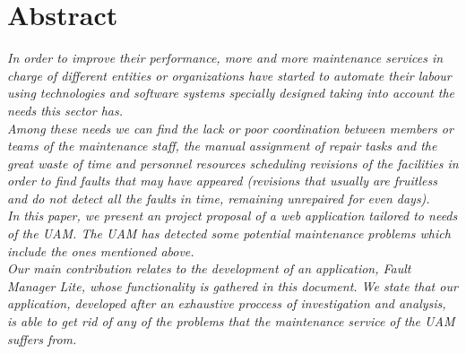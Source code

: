 \section{Abstract}

\textit{
In order to improve their performance, more and more maintenance services in charge of different entities or organizations have started to automate their labour using technologies and software systems specially designed taking into account the needs this sector has.\\
Among these needs we can find the lack or poor coordination between members or teams of the maintenance staff, the manual assignment of repair tasks and the great waste of time and personnel resources scheduling revisions of the facilities in order to find faults that may have appeared (revisions that usually are fruitless and do not detect all the faults in time, remaining unrepaired for even days).\\
In this paper, we present an project proposal of a web application tailored to needs of the UAM. The UAM has detected some potential maintenance problems which include the ones mentioned above.\\
Our main contribution relates to the development of an application, Fault Manager Lite, whose functionality is gathered in this document. We state that our application, developed after an exhaustive proccess of investigation and analysis, is able to get rid of any of the problems that the maintenance service of the UAM suffers from.\\
}